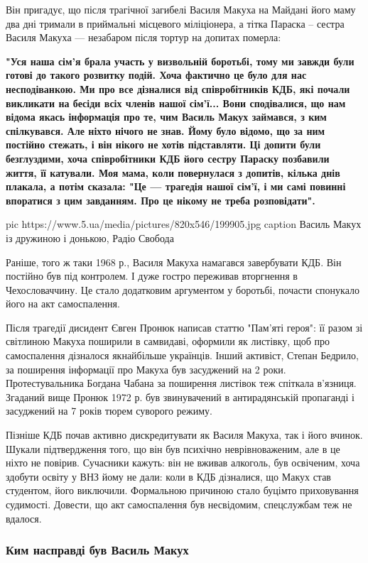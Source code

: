 Він пригадує, що після трагічної загибелі Василя Макуха на Майдані його
маму два дні тримали в приймальні місцевого міліціонера, а тітка Параска –
сестра Василя Макуха --- незабаром після тортур на допитах померла:

{\bfseries
"Уся наша сім'я брала участь у визвольній боротьбі, тому ми завжди були
готові до такого розвитку подій. Хоча фактично це було для нас
несподіванкою. Ми про все дізналися від співробітників КДБ, які почали
викликати на бесіди всіх членів нашої сім'ї... Вони сподівалися, що нам
відома якась інформація про те, чим Василь Макух займався, з ким
спілкувався. Але ніхто нічого не знав. Йому було відомо, що за ним
постійно стежать, і він нікого не хотів підставляти. Ці допити були
безглуздими, хоча співробітники КДБ його сестру Параску позбавили життя,
її катували. Моя мама, коли повернулася з допитів, кілька днів плакала,
а потім сказала: "Це --- трагедія нашої сім'ї, і ми самі повинні впоратися
з цим завданням. Про це нікому не треба розповідати".
}

\ifcmt
pic https://www.5.ua/media/pictures/820x546/199905.jpg
caption Василь Макух із дружиною і донькою, Радіо Свобода
\fi

Раніше, того ж таки 1968 р., Василя Макуха намагався завербувати КДБ. Він
постійно був під контролем. І дуже гостро переживав вторгнення в
Чехословаччину. Це стало додатковим аргументом у боротьбі, почасти
спонукало його на акт самоспалення.

Після трагедії дисидент Євген Пронюк написав статтю "Пам'яті героя": її
разом зі світлиною Макуха поширили в самвидаві, оформили як листівку, щоб
про самоспалення дізналося якнайбільше українців. Інший активіст, Степан
Бедрило, за поширення інформації про Макуха був засуджений на 2 роки.
Протестувальника Богдана Чабана за поширення листівок теж спіткала
в'язниця. Згаданий вище Пронюк 1972 р. був звинувачений в антирадянській
пропаганді і засуджений на 7 років тюрем суворого режиму.

Пізніше КДБ почав активно дискредитувати як Василя Макуха, так і його
вчинок. Шукали підтвердження того, що він був психічно неврівноваженим,
але в це ніхто не повірив. Сучасники кажуть: він не вживав алкоголь, був
освіченим, хоча здобути освіту у ВНЗ йому не дали: коли в КДБ дізналися,
що Макух став студентом, його виключили. Формальною причиною стало буцімто
приховування судимості. Довести, що акт самоспалення був несвідомим,
спецслужбам теж не вдалося.

\subsubsection{Ким насправді був Василь Макух}

